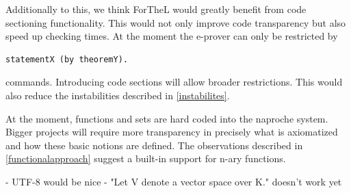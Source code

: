 \documentclass[11pt]{article}
\begin{document}
Additionally to this, we think ForTheL would greatly benefit from code sectioning functionality. This would not only improve code transparency but also speed up checking times. At the moment the e-prover can only be restricted by 
\begin{lstlisting}
statementX (by theoremY).
\end{lstlisting}  commands. Introducing code sections will allow broader restrictions. This would also reduce the instabilities described in \ref{instabilites}.

At the moment, functions and sets are hard coded into the naproche system. Bigger projects will require more transparency in precisely what is axiomatized and how these basic notions are defined. The observations described in \ref{functionalapproach} suggest a built-in support for n-ary functions.


- UTF-8 would be nice
- "Let V denote a vector space over K." doesn't work yet
\end{document}

